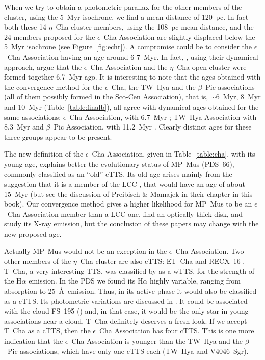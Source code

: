 \documentclass[11pt,twoside]{book}
\begin{document}
When we try to obtain a photometric parallax for the other members of the cluster,
using the 5~Myr isochrone, we find a mean distance of 120~pc.
In fact both these 14 $\eta$~Cha cluster members, using the 108~pc mean distance, and
the 24 members proposed for the $\epsilon$~Cha Association are slightly
displaced below the 5~Myr isochrone  (see Figure~\ref{fig:echr}).
A compromise could be to consider the $\epsilon$~Cha Association having an age around 6-7~Myr.
In fact, \citet{jilinski05}, using their dynamical approach,  argue that
the $\epsilon$~Cha Association and the $\eta$~Cha open cluster were formed together 6.7~Myr ago.
It is interesting to note that the ages obtained with the convergence method for the $\epsilon$~Cha,
the TW~Hya and the $\beta$~Pic associations  (all of them possibly formed in the Sco-Cen
Association), that is, $\sim$6~Myr, 8~Myr
and 10~Myr (Table~\ref{table:finalb}), all agree with dynamical ages
obtained for the same associations: $\epsilon$~Cha Association, with 6.7~Myr \citep{jilinski05};
TW~Hya Association with 8.3~Myr \citep{reza06}  and $\beta$~Pic Association,
with 11.2~Myr \citep{ortega02, ortega04}.
Clearly distinct ages for these three groups appear to be present.


The new definition of the $\epsilon$~Cha Association, given in
Table~\ref{table:cha}, with its young age,
explains better the evolutionary status of
MP~Mus (PDS~66), commonly classified as an ``old'' cTTS.
Its old age  arises mainly from the suggestion
that it is a member of the LCC \citep{mamajek02}, that would have an age of about 15~Myr
(but see the discussion of Preibisch \& Mamajek in their chapter in this book).
Our convergence method gives a higher likelihood for MP~Mus to be an
$\epsilon$~Cha Association member than a LCC one.
\citet{silverstone06} find an optically thick disk, and \citet{argiroffi07} study its X-ray emission,
but the conclusion of these papers may change with the new proposed age.


Actually MP~Mus would not be an exception in the $\epsilon$~Cha
Association.  Two other members of the $\eta$~Cha cluster are also
cTTS: ET~Cha \citep{lawson02} and RECX~16 \citep{song04}.  T~Cha, a
very interesting TTS, was classified by \citet{alcala93} as a wTTS,
for the strength of the H$\alpha$ emission.  In the PDS we found its
H$\alpha$ highly variable, ranging from absorption to 25~\AA\,
emission.  Thus, in its active phase it would also be classified as a
cTTS.  Its photometric variations are discussed in \citet{batalha98}.
It could be associated with the cloud FS~195 (\citet{covino97}) and,
in that case, it would be the only star in young associations near a
cloud.  T~Cha definitely deserves a fresh look.  If we accept T~Cha as
a cTTS, then the $\epsilon$~Cha Association has four cTTS.  This is
one more indication that the $\epsilon$~Cha Association is younger
than the TW~Hya and the $\beta$~Pic associations, which have only one
cTTS each (TW~Hya and V4046~Sgr).
\end{document}
